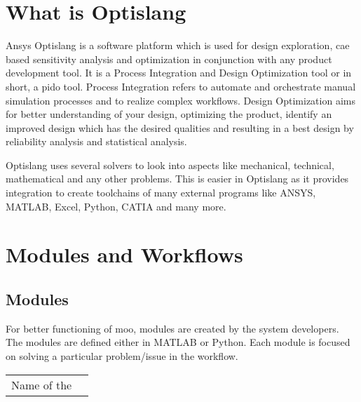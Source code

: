 \section{What is Optislang}
Ansys Optislang \cite{optislang} is a software platform which is used for design exploration, \acrshort{cae} based sensitivity analysis and optimization in conjunction with any product development tool. It is a Process Integration and 
Design Optimization tool or in short, a \acrshort{pido} tool. Process Integration refers to automate and orchestrate manual simulation processes and to realize
complex workflows. Design Optimization aims for better understanding of your design, optimizing the product, identify an improved design which has the desired
qualities and resulting in a best design by reliability analysis and statistical analysis.  


Optislang uses several solvers to look into aspects like mechanical, technical, mathematical and any other problems. This is easier in Optislang as it provides
integration to create toolchains of many external programs like ANSYS, MATLAB, Excel, Python, CATIA and many more.

\section{Modules and Workflows}
\subsection{Modules}
For better functioning of \acrshort{moo}, modules are created by the system developers. The modules are defined either in MATLAB or Python. Each module is 
focused on solving a particular problem/issue in the workflow.

\begin{table}
    \begin{tabular}{|>{\centering\arraybackslash}p{2cm}|>{\centering\arraybackslash}p{12cm}|}
        \hline
        Name of  the 
    \end{tabular}
\end{table}